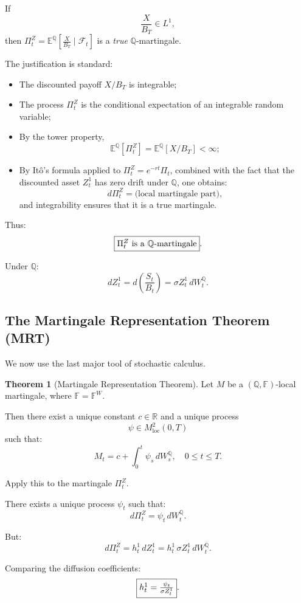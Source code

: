 \documentclass[12pt,a4paper]{article}
\theoremstyle{definition}
\newtheorem{theorem}{Theorem}[section]
\begin{document}
If
\[
\frac{X}{B_T} \in L^1,
\]
then $\Pi_t^Z = \mathbb{E}^\mathbb{Q}\left[\frac{X}{B_T} \mid \mathcal{F}_t\right]$ is a \emph{true} $\mathbb{Q}$-martingale.

The justification is standard:
\begin{itemize}
\item The discounted payoff $X / B_T$ is integrable;
\item The process $\Pi_t^Z$ is the conditional expectation of an integrable random variable;
\item By the tower property,
\[
\mathbb{E}^\mathbb{Q}[\Pi_t^Z] = \mathbb{E}^\mathbb{Q}[X / B_T] < \infty;
\]
\item By Itô's formula applied to $\Pi_t^Z = e^{-rt} \Pi_t$, combined with the fact that the discounted asset $Z_t^1$ has zero drift under $\mathbb{Q}$, one obtains:
\[
d\Pi_t^Z = \text{(local martingale part)},
\]
and integrability ensures that it is a true martingale.
\end{itemize}

Thus:
\[
\fbox{$\Pi_t^Z$ is a $\mathbb{Q}$-martingale}.
\]

Under $\mathbb{Q}$:
\[
dZ_t^1 = d\!\left(\frac{S_t}{B_t}\right) = \sigma Z_t^1 \, dW_t^\mathbb{Q}.
\]

\subsection{The Martingale Representation Theorem (MRT)}

We now use the last major tool of stochastic calculus.

\begin{theorem}[Martingale Representation Theorem]
Let $M$ be a $(\mathbb{Q}, \mathbb{F})$-local martingale, where $\mathbb{F} = \mathbb{F}^W$.

Then there exist a unique constant $c \in \mathbb{R}$ and a unique process
\[
\psi \in M_{\text{loc}}^2(0, T)
\]
such that:
\[
M_t = c + \int_0^t \psi_s \, dW_s^\mathbb{Q}, \quad 0 \leq t \leq T.
\]
\end{theorem}

Apply this to the martingale $\Pi_t^Z$.

There exists a unique process $\psi_t$ such that:
\[
d\Pi_t^Z = \psi_t \, dW_t^\mathbb{Q}.
\]

But:
\[
d\Pi_t^Z = h_t^1 \, dZ_t^1 = h_t^1 \, \sigma Z_t^1 \, dW_t^\mathbb{Q}.
\]

Comparing the diffusion coefficients:
\[
\fbox{$h_t^1 = \frac{\psi_t}{\sigma Z_t^1}$}.
\]
\end{document}

